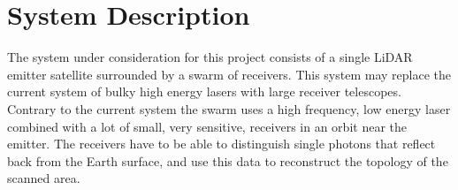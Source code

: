 \section{System Description}
\label{dsePPSystemDescription}
The system under consideration for this project consists of a single LiDAR emitter satellite surrounded by a swarm of receivers. This system may replace the current system of bulky high energy lasers with large receiver telescopes. Contrary to the current system the swarm uses a high frequency, low energy laser combined with a lot of small, very sensitive, receivers in an orbit near the emitter. The receivers have to be able to distinguish single photons that reflect back from the Earth surface, and use this data to reconstruct the topology of the scanned area.
